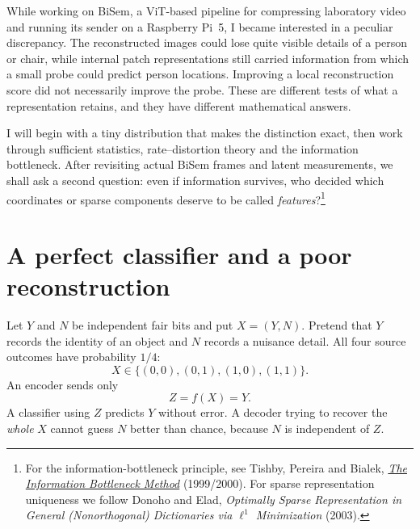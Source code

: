 
While working on BiSem, a ViT-based pipeline for compressing laboratory video and running its sender on a Raspberry Pi~5, I became interested in a peculiar discrepancy. The reconstructed images could lose quite visible details of a person or chair, while internal patch representations still carried information from which a small probe could predict person locations. Improving a local reconstruction score did not necessarily improve the probe. These are different tests of what a representation retains, and they have different mathematical answers.

I will begin with a tiny distribution that makes the distinction exact, then work through sufficient statistics, rate--distortion theory and the information bottleneck. After revisiting actual BiSem frames and latent measurements, we shall ask a second question: even if information survives, who decided which coordinates or sparse components deserve to be called \emph{features}?\footnote{For the information-bottleneck principle, see Tishby, Pereira and Bialek, \href{https://arxiv.org/abs/physics/0004057}{\emph{The Information Bottleneck Method}} (1999/2000). For sparse representation uniqueness we follow Donoho and Elad, \emph{Optimally Sparse Representation in General (Nonorthogonal) Dictionaries via \(\ell^1\) Minimization} (2003).}

\section{A perfect classifier and a poor reconstruction}

Let \(Y\) and \(N\) be independent fair bits and put \(X=(Y,N)\). Pretend that \(Y\) records the identity of an object and \(N\) records a nuisance detail. All four source outcomes have probability \(1/4\):
\[
 X\in\{(0,0),(0,1),(1,0),(1,1)\}.
\]
An encoder sends only
\[
 Z=f(X)=Y.
\]
A classifier using \(Z\) predicts \(Y\) without error. A decoder trying to recover the \emph{whole} \(X\) cannot guess \(N\) better than chance, because \(N\) is independent of \(Z\).

